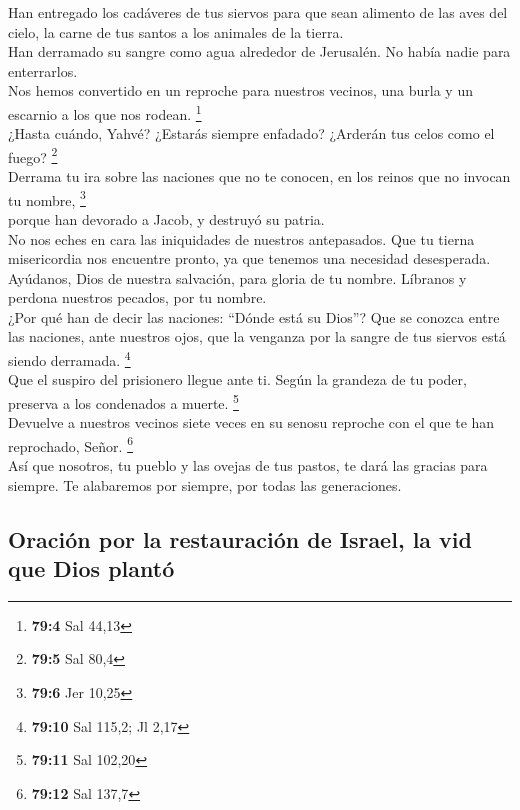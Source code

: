  Han entregado los cadáveres de tus siervos para que sean
alimento de las aves del cielo, la carne de tus santos a los animales de
la tierra.\\
 Han derramado su sangre como agua alrededor de Jerusalén.
No había nadie para enterrarlos.\\
 Nos hemos convertido en un reproche para nuestros
vecinos, una burla y un escarnio a los que nos rodean. \footnote{\textbf{79:4}
  Sal 44,13}\\
 ¿Hasta cuándo, Yahvé? ¿Estarás siempre enfadado? ¿Arderán
tus celos como el fuego? \footnote{\textbf{79:5} Sal 80,4}\\
 Derrama tu ira sobre las naciones que no te conocen, en
los reinos que no invocan tu nombre, \footnote{\textbf{79:6} Jer 10,25}\\
 porque han devorado a Jacob, y destruyó su patria.\\
 No nos eches en cara las iniquidades de nuestros
antepasados. Que tu tierna misericordia nos encuentre pronto, ya que
tenemos una necesidad desesperada.\\
 Ayúdanos, Dios de nuestra salvación, para gloria de tu
nombre. Líbranos y perdona nuestros pecados, por tu nombre.\\
 ¿Por qué han de decir las naciones: ``Dónde está su
Dios''? Que se conozca entre las naciones, ante nuestros ojos, que la
venganza por la sangre de tus siervos está siendo derramada.
\footnote{\textbf{79:10} Sal 115,2; Jl 2,17}\\
 Que el suspiro del prisionero llegue ante ti. Según la
grandeza de tu poder, preserva a los condenados a muerte. \footnote{\textbf{79:11}
  Sal 102,20}\\
 Devuelve a nuestros vecinos siete veces en su senosu
reproche con el que te han reprochado, Señor. \footnote{\textbf{79:12}
  Sal 137,7}\\
 Así que nosotros, tu pueblo y las ovejas de tus pastos,
te dará las gracias para siempre. Te alabaremos por siempre, por todas
las generaciones.

\hypertarget{oraciuxf3n-por-la-restauraciuxf3n-de-israel-la-vid-que-dios-plantuxf3}{%
\subsection{Oración por la restauración de Israel, la vid que Dios
plantó}\label{oraciuxf3n-por-la-restauraciuxf3n-de-israel-la-vid-que-dios-plantuxf3}}

